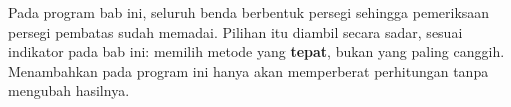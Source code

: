 \begin{catatabox}
Pada program bab ini, seluruh benda berbentuk persegi sehingga pemeriksaan
persegi pembatas sudah memadai. Pilihan itu diambil secara sadar, sesuai
indikator  pada bab ini: memilih metode yang \textbf{tepat}, bukan yang
paling canggih. Menambahkan  pada program ini hanya akan
memperberat perhitungan tanpa mengubah hasilnya.
\end{catatabox}
